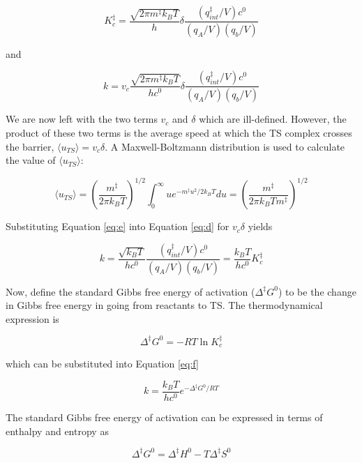 \begin{equation}
  K_c^{\ddagger} =  \frac{\sqrt{2\pi m^\ddagger k_BT}}{h}\delta\frac{(q_{int}^\ddagger/V)c^0}{(q_A/V)(q_b/V)}
\end{equation}

\noindent and

\begin{equation}
 k = v_c \frac{\sqrt{2\pi m^\ddagger
     k_BT}}{hc^0}\delta\frac{(q_{int}^\ddagger/V)c^0}{(q_A/V)(q_b/V)}
\label{eq:d}
\end{equation}

We are now left with the two terms $v_c$ and $\delta$ which are
ill-defined. However, the product of these two terms is the average speed at
which the TS complex crosses the barrier, $\langle u_{TS} \rangle =
v_c\delta$. A Maxwell-Boltzmann distribution is used to calculate the value of
$\langle u_{TS} \rangle$:

\begin{equation}
  \langle u_{TS} \rangle = \left( \frac{m^\ddagger}{2\pi k_BT} \right)^{1/2}
  \int_0^\infty u e^{-m^\ddagger u^2/2k_BT}du = \left( \frac{m^\ddagger}{2\pi
      k_BT m^\ddagger} \right)^{1/2}
\label{eq:e}
\end{equation}

\noindent Substituting Equation \ref{eq:e} into Equation \ref{eq:d} for
$v_c\delta$ yields

\begin{equation}
  k =
  \frac{\sqrt{k_BT}}{hc^0}\frac{(q_{int}^\ddagger/V)c^0}{(q_A/V)(q_b/V)} = \frac{k_BT}{hc^0}K_c^\ddagger
\label{eq:f}
\end{equation}

Now, define the standard Gibbs free energy of activation
($\Delta ^\ddagger G^0$) to be the change in Gibbs free energy in going from
reactants to TS. The thermodynamical expression is

\begin{equation}
  \Delta ^\ddagger G^0 = -RT \ln K_c^\ddagger
\end{equation}

\noindent which can be substituted into Equation \ref{eq:f}

\begin{equation}
  k = \frac{k_BT}{hc^0} e^{-\Delta^\ddagger G^0/RT}
\label{eq:g}
\end{equation}

The standard Gibbs free energy of activation can be expressed in terms of
enthalpy and entropy as

\begin{equation}
  \Delta^\ddagger G^0 = \Delta^\ddagger H^0 - T \Delta^\ddagger S^0
\end{equation}

